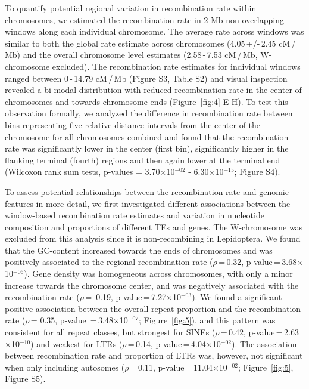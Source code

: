 \documentclass[twocolumn]{bmcart}%
\begin{document}
To quantify potential regional variation in recombination rate within chromosomes, we estimated the recombination rate in 2 Mb non-overlapping windows along each individual chromosome. The average rate across windows was similar to both the global rate estimate across chromosomes (4.05\,+/-\,2.45 cM\,/\,Mb) and the overall chromosome level estimates (2.58\,-\,7.53 cM\,/\,Mb, W-chromosome excluded). The recombination rate estimates for individual windows ranged between 0\,-\,14.79 cM\,/\,Mb (Figure S3, Table S2) and visual inspection revealed a bi-modal distribution with reduced recombination rate in the center of chromosomes and towards chromosome ends (Figure~\ref{fig:4} E-H). To test this observation formally, we analyzed the difference in recombination rate between bins representing five relative distance intervals from the center of the chromosome for all chromosomes combined and found that the recombination rate was significantly lower in the center (first bin), significantly higher in the flanking terminal (fourth) regions and then again lower at the terminal end (Wilcoxon rank sum tests, p-values = 3.70$\times$10$^{-02}$ - 6.30$\times$10$^{-15}$; Figure S4).

To assess potential relationships between the recombination rate and genomic features in more detail, we first investigated different associations between the window-based recombination rate estimates and variation in nucleotide composition and proportions of different TEs and genes. The W-chromosome was excluded from this analysis since it is non-recombining in Lepidoptera. We found that the GC-content increased towards the ends of chromosomes and was positively associated to the regional recombination rate ($\rho$\,=\,0.32, p-value\,=\,3.68$\times$10$^{-06}$). Gene density was homogeneous across chromosomes, with only a minor increase towards the chromosome center, and was negatively associated with the recombination rate ($\rho$\,=\,-0.19, p-value\,=\,7.27$\times$10$^{-03}$). We found a significant positive association between the overall repeat proportion and the recombination rate ($\rho$\,= 0.35, p-value \,=\,3.48$\times$10$^{-07}$; Figure~\ref{fig:5}), and this pattern was consistent for all repeat classes, but strongest for SINEs ($\rho$\,=\,0.42, p-value\,=\,2.63$\times$10$^{-10}$) and weakest for LTRs ($\rho$\,=\,0.14, p-value\,=\,4.04$\times$10$^{-02}$). The association between recombination rate and proportion of LTRs was, however, not significant when only including autosomes ($\rho$\,=\,0.11, p-value\,=\,11.04$\times$10$^{-02}$; Figure~\ref{fig:5}, Figure S5).
\end{document}
